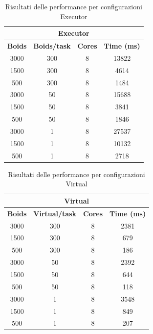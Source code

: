 \documentclass[a4paper,12pt]{report}
\begin{document}
\begin{table}[h!]
    \centering
    \begin{tabular}{|c|c|c|c|}
    \hline
    \multicolumn{4}{|c|}{\textbf{Executor}} \\
    \hline
    \textbf{Boids} & \textbf{Boids/task} & \textbf{Cores} & \textbf{Time (ms)}\\
    \hline
    3000 & 300 & 8 & 13822 \\
    1500 & 300 & 8 & 4614 \\
    500  & 300 & 8 & 1484 \\
    \hline
    \hline
    3000 & 50  & 8 & 15688 \\
    1500 & 50  & 8 & 3841 \\
    500  & 50  & 8 & 1846 \\
    \hline
    \hline
    3000 & 1   & 8 & 27537 \\
    1500 & 1   & 8 & 10132 \\
    500  & 1   & 8 & 2718 \\
    \hline
    \end{tabular}
    \caption{Risultati delle performance per configurazioni Executor}
    \label{tab:executor-performance}
\end{table}

\begin{table}[h!]
    \centering
    \begin{tabular}{|c|c|c|c|}
    \hline
    \multicolumn{4}{|c|}{\textbf{Virtual}} \\
    \hline
    \textbf{Boids} & \textbf{Virtual/task} & \textbf{Cores} & \textbf{Time (ms)}\\
    \hline
    3000 & 300 & 8  & 2381 \\
    1500 & 300 & 8  & 679  \\
    500  & 300 & 8  & 186  \\
    \hline
    \hline
    3000 & 50  & 8  & 2392 \\
    1500 & 50  & 8  & 644  \\
    500  & 50  & 8  & 118  \\
    \hline
    \hline
    3000 & 1   & 8  & 3548 \\
    1500 & 1   & 8  & 849  \\
    500  & 1   & 8  & 207  \\
    \hline
    \end{tabular}
    \caption{Risultati delle performance per configurazioni Virtual}
    \label{tab:virtual-performance}
\end{table}
\end{document}
